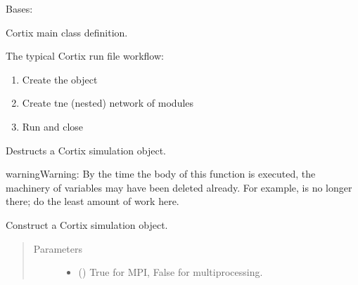 \documentclass[letterpaper,10pt,openany,oneside,english]{sphinxmanual}
\begin{document}
\begin{fulllineitems}
\label{\detokenize{src_rst/cortix_main:cortix_main.Cortix}}
Bases: 

Cortix main class definition.

The typical Cortix run file workflow:
\begin{enumerate}
\item {} 
Create the  object

\item {} 
Create tne (nested) network of modules

\item {} 
Run and close 

\end{enumerate}

\begin{fulllineitems}
\label{\detokenize{src_rst/cortix_main:cortix_main.Cortix.__del__}}
Destructs a Cortix simulation object.

\begin{sphinxadmonition}{warning}{Warning:}
By the time the body of this function is executed, the machinery of
variables may have been deleted already. For example,  is no longer
there; do the least amount of work here.
\end{sphinxadmonition}

\end{fulllineitems}


\begin{fulllineitems}
\label{\detokenize{src_rst/cortix_main:cortix_main.Cortix.__init__}}
Construct a Cortix simulation object.
\begin{quote}\begin{description}
\item[{Parameters}] \leavevmode\begin{itemize}
\item {} 
 () \textendash{} True for MPI, False for multiprocessing.


\end{itemize}
\end{description}
\end{quote}
\end{fulllineitems}
\end{fulllineitems}
\end{document}

